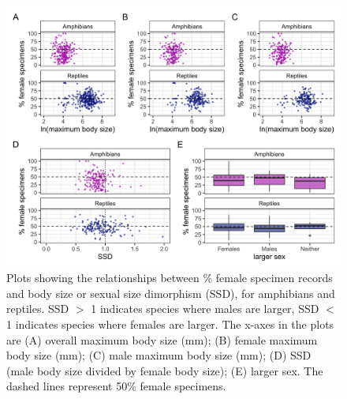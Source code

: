 \documentclass[a4paper, 12pt]{article}
\begin{document}
\newpage
\begin{figure}[h]
 \centering
  \includegraphics[width = \linewidth]{figures/size-combined.png}
  \caption{Plots showing the relationships between \% female specimen records and body size or sexual size dimorphism (SSD), for amphibians and reptiles. SSD $>$ 1 indicates species where males are larger, SSD $<$ 1 indicates species where females are larger. The x-axes in the plots are (A) overall maximum body size (mm); (B) female maximum body size (mm); (C) male maximum body size (mm); (D) SSD (male body size divided by female body size); (E) larger sex. The dashed lines represent 50\% female specimens.
}
  \label{fig-ssd-female}
\end{figure}
\end{document}

